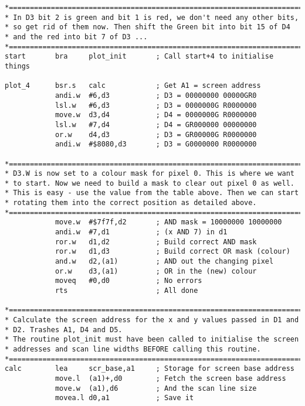 \begin{lstlisting}[firstnumber=1,caption={Mode 4 Screen Plotting},label={lst:Mode4ScreenPlotting}]
*======================================================================
* In D3 bit 2 is green and bit 1 is red, we don't need any other bits, 
* so get rid of them now. Then shift the Green bit into bit 15 of D4 
* and the red into bit 7 of D3 ...
*======================================================================
start       bra     plot_init       ; Call start+4 to initialise things

plot_4      bsr.s   calc            ; Get A1 = screen address
            andi.w  #6,d3           ; D3 = 00000000 00000GR0
            lsl.w   #6,d3           ; D3 = 0000000G R0000000
            move.w  d3,d4           ; D4 = 0000000G R0000000
            lsl.w   #7,d4           ; D4 = GR000000 00000000
            or.w    d4,d3           ; D3 = GR00000G R0000000
            andi.w  #$8080,d3       ; D3 = G0000000 R0000000

*======================================================================
* D3.W is now set to a colour mask for pixel 0. This is where we want 
* to start. Now we need to build a mask to clear out pixel 0 as well. 
* This is easy - use the value from the table above. Then we can start 
* rotating them into the correct position as detailed above.
*======================================================================
            move.w  #$7f7f,d2       ; AND mask = 10000000 10000000
            andi.w  #7,d1           ; (x AND 7) in d1
            ror.w   d1,d2           ; Build correct AND mask
            ror.w   d1,d3           ; Build correct OR mask (colour)
            and.w   d2,(a1)         ; AND out the changing pixel
            or.w    d3,(a1)         ; OR in the (new) colour
            moveq   #0,d0           ; No errors
            rts                     ; All done

*======================================================================
* Calculate the screen address for the x and y values passed in D1 and
* D2. Trashes A1, D4 and D5.
* The routine plot_init must have been called to initialise the screen 
* addresses and scan line widths BEFORE calling this routine.
*======================================================================
calc        lea     scr_base,a1     ; Storage for screen base address
            move.l  (a1)+,d0        ; Fetch the screen base address
            move.w  (a1),d6         ; And the scan line size
            movea.l d0,a1           ; Save it


\end{lstlisting}
